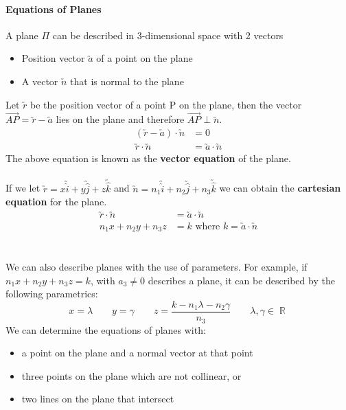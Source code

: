 \documentclass[a4paper,twoside,10pt]{article}
\DeclareMathOperator\R{\mathbb{R}}
\begin{document}
			\paragraph{Equations of Planes} A plane $\Pi$ can be described in 3-dimensional space with 2 vectors
			\begin{itemize}
				\item Position vector $\utilde{a}$ of a point on the plane
				\item A vector $\utilde{n}$ that is normal to the plane
			\end{itemize}
			Let $\utilde{r}$ be the position vector of a point P on the plane, then the vector $\overrightarrow{AP}=\utilde{r}-\utilde{a}$ lies on the plane and therefore $\overrightarrow{AP}\perp\utilde{n}$.\\
			\begin{align*}
				(\utilde{r}-\utilde{a})\cdot\utilde{n}&=0 \\
				\utilde{r}\cdot\utilde{n}&=\utilde{a}\cdot\utilde{n}
			\end{align*}
			The above equation is known as the \textbf{vector equation} of the plane.\\\\
			If we let $\utilde{r}=x\utilde{\hat{i}}+y\utilde{\hat{j}}+z\utilde{\hat{k}}$ and $\utilde{n}=n_1\utilde{\hat{i}}+n_2\utilde{\hat{j}}+n_3\utilde{\hat{k}}$ we can obtain the \textbf{cartesian equation} for the plane.\\
			\begin{align*}
				\utilde{r}\cdot\utilde{n}&=\utilde{a}\cdot\utilde{n} \\
				n_1x+n_2y+n_3z&=k\text{ where }k=\utilde{a}\cdot\utilde{n}
			\end{align*}
			\\\\
			We can also describe planes with the use of parameters. For example, if $n_1x+n_2y+n_3z=k$, with $a_3\neq0$ describes a plane, it can be described by the following parametrics:
			\begin{equation*}
				x=\lambda \qquad y=\gamma \qquad z=\frac{k-n_1\lambda-n_2\gamma}{n_3} \qquad \lambda,\gamma\in\R
			\end{equation*}
			We can determine the equations of planes with:
			\begin{itemize}
				\item a point on the plane and a normal vector at that point
				\item three points on the plane which are not collinear, or
				\item two lines on the plane that intersect
			\end{itemize}
		
\end{document}
